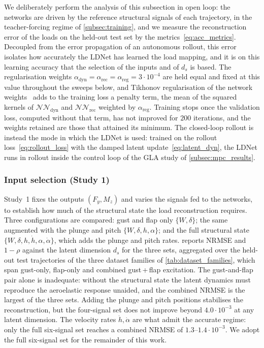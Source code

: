 We deliberately perform the analysis of this subsection in open loop: the networks are driven by the reference structural signals of each trajectory, in the teacher-forcing regime of \cref{subsec:training}, and we measure the reconstruction error of the loads on the held-out test set by the metrics~\eqref{eq:acc_metrics}. Decoupled from the error propagation of an autonomous rollout, this error isolates how accurately the LDNet has learned the load mapping, and it is on this learning accuracy that the selection of the inputs and of $d_s$ is based. The regularisation weights $\alpha_\mathrm{dyn}=\alpha_\mathrm{rec}=\alpha_\mathrm{reg}=3\cdot10^{-4}$ are held equal and fixed at this value throughout the sweeps below, and Tikhonov regularisation of the network weights~\cite{Regazzoni} adds to the training loss a penalty term, the mean of the squared kernels of $\mathcal{NN}_\mathrm{dyn}$ and $\mathcal{NN}_\mathrm{rec}$ weighted by $\alpha_\mathrm{reg}$. Training stops once the validation loss, computed without that term, has not improved for $200$ iterations, and the weights retained are those that attained its minimum. The closed-loop rollout is instead the mode in which the LDNet is used: trained on the rollout loss~\eqref{eq:rollout_loss} with the damped latent update~\eqref{eq:latent_dyn}, the LDNet runs in rollout inside the control loop of the GLA study of \cref{subsec:mpc_results}.

\subsubsection{Input selection (Study 1)}
\label{subsubsec:input_selection}

Study~1 fixes the outputs $(F_y,M_z)$ and varies the signals fed to the networks, to
establish how much of the structural state the load reconstruction requires. Three
configurations are compared: gust and flap only $\{W,\delta\}$; the same augmented with the
plunge and pitch $\{W,\delta,h,\alpha\}$; and the full structural state
$\{W,\delta,h,\dot h,\alpha,\dot\alpha\}$, which adds the plunge and pitch rates.
 reports NRMSE and $1-\rho$ against the latent dimension $d_s$ for
the three sets, aggregated over the held-out test trajectories of the three dataset families
of \cref{tab:dataset_families}, which span gust-only, flap-only and combined gust\,+\,flap
excitation. The gust-and-flap pair alone is inadequate: without the structural state the
latent dynamics must reproduce the aeroelastic response unaided, and the combined NRMSE is the
largest of the three sets.
Adding the plunge and pitch positions stabilises the reconstruction, but the four-signal set
does not improve beyond $4.0\cdot10^{-3}$ at any latent dimension. The velocity rates
$\dot h,\dot\alpha$ are what admit the accurate regime: only the full six-signal set reaches a
combined NRMSE of $1.3$--$1.4\cdot10^{-3}$. We
adopt the full six-signal set for the remainder of this work.

